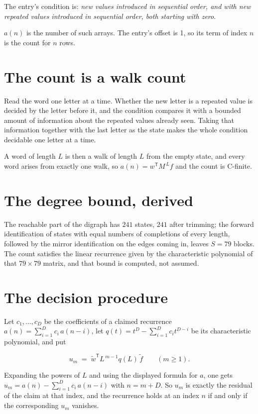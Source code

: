 \documentclass[11pt]{article}
\theoremstyle{definition}
\begin{document}
The entry's condition is: {\itshape new values introduced in sequential order, and with new repeated values introduced in sequential order, both starting with zero}.

$a(n)$ is the number of such arrays. The entry's offset is 1, so its term of index $n$ is the count for $n$ rows.

\section{The count is a walk count}

Read the word one letter at a time. Whether the new letter is a repeated value is decided by the letter before it, and the condition compares it with a bounded amount of information about the repeated values already seen. Taking that information together with the last letter as the state makes the whole condition decidable one letter at a time.

A word of length $L$ is then a walk of length $L$ from the empty state, and every word arises from exactly one walk, so $a(n) = w^{\mathsf T}M^{\,L}f$ and the count is C-finite.

\section{The degree bound, derived}

The reachable part of the digraph has $241$ states, $241$ after trimming; the forward identification of states with equal numbers of completions of every length, followed by the mirror identification on the edges coming in, leaves $S = 79$ blocks. The count satisfies the linear recurrence given by the characteristic polynomial of that $79\times79$ matrix, and that bound is computed, not assumed.

\section{The decision procedure}

Let $c_1,\dots,c_D$ be the coefficients of a claimed recurrence $a(n) = \sum_{i=1}^{D} c_i\,a(n-i)$, let $q(t) = t^{D} - \sum_{i=1}^{D} c_i t^{D-i}$ be its characteristic polynomial, and put

\[u_m \;=\; \tilde w^{\mathsf T} L^{\,m-1} q(L)\,\tilde f \qquad (m \ge 1).\]

Expanding the powers of $L$ and using the displayed formula for $a$, one gets $u_m = a(n) - \sum_{i=1}^{D} c_i\,a(n-i)$ with $n = m + D$. So $u_m$ is exactly the residual of the claim at that index, and the recurrence holds at an index $n$ if and only if the corresponding $u_m$ vanishes.
\end{document}
